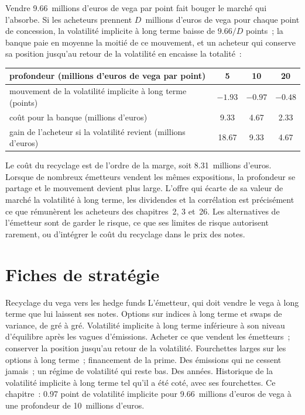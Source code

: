 Vendre 9.66~millions d'euros de vega par point fait bouger le marché qui l'absorbe. Si les acheteurs prennent $D$~millions d'euros de vega pour chaque point de concession, la volatilité implicite à long terme
baisse de $9.66/D$ points~; la banque paie en moyenne la moitié de ce mouvement, et un acheteur qui conserve sa position jusqu'au retour de la volatilité en encaisse la totalité~:

\begin{center}
\small
\begin{tabular}{@{}lccc@{}}
\toprule
profondeur (millions d'euros de vega par point) & 5 & 10 & 20\\
\midrule
mouvement de la volatilité implicite à long terme (points) & $-1.93$ & $-0.97$ & $-0.48$\\
coût pour la banque (millions d'euros) & 9.33 & 4.67 & 2.33\\
gain de l'acheteur si la volatilité revient (millions d'euros) & 18.67 & 9.33 & 4.67\\
\bottomrule
\end{tabular}
\end{center}

Le coût du recyclage est de l'ordre de la marge, soit 8.31~millions d'euros. Lorsque de nombreux émetteurs vendent les mêmes expositions, la profondeur se partage et le mouvement
devient plus large. L'offre qui écarte de sa valeur de marché la volatilité à long terme, les dividendes et la corrélation est précisément ce que rémunèrent les acheteurs des chapitres~2, 3 et~26.
Les alternatives de l'émetteur sont de garder le risque, ce que ses limites de risque autorisent rarement, ou d'intégrer le coût du recyclage dans le prix des notes.

\section{Fiches de stratégie}

\begin{strategyfile}{Recyclage du vega vers les hedge funds}\label{strat:s2:hedging-a-structured-products-book:vega}
 L'émetteur, qui doit vendre le vega à long terme que lui laissent ses notes.
 Options sur indices à long terme et swaps de variance, de gré à gré.
 Volatilité implicite à long terme inférieure à son niveau d'équilibre après les vagues d'émissions.
 Acheter ce que vendent les émetteurs~; conserver la position jusqu'au retour de la volatilité.
 Fourchettes larges sur les options à long terme~; financement de la prime.
 Des émissions qui ne cessent jamais~; un régime de volatilité qui reste bas.
 Des années.
 Historique de la volatilité implicite à long terme tel qu'il a été coté, avec ses fourchettes.
 Ce chapitre~: 0.97 point de volatilité implicite pour 9.66~millions d'euros de vega à une profondeur de 10~millions d'euros.
\end{strategyfile}


